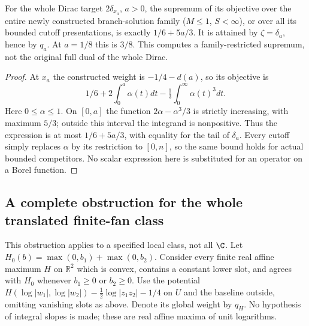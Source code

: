 \begin{proposition}\label{branch:diracobjective}
For the whole Dirac target $2\delta_{x_a}$, $a>0$, the supremum of its
objective over the entire newly constructed branch-solution family
($M\le1$, $S<\infty$), or over all its bounded cutoff presentations, is
exactly $1/6+5a/3$. It is attained by $\zeta=\delta_a$, hence by $q_a$.
At $a=1/8$ this is $3/8$. This computes a family-restricted supremum,
not the original full dual of the whole Dirac.
\end{proposition}
\begin{proof}
At $x_a$ the constructed weight is $-1/4-d(a)$, so its objective is
\[
 1/6+2\int_0^a\alpha(t)dt-\tfrac13\int_0^\infty\alpha(t)^3dt.
\]
Here $0\le\alpha\le1$. On $[0,a]$ the function
$2\alpha-\alpha^3/3$ is strictly increasing, with maximum $5/3$;
outside this interval the integrand is nonpositive. Thus the expression
is at most $1/6+5a/3$, with equality for the tail of $\delta_a$.
Every cutoff simply replaces $\alpha$ by its restriction to $[0,n]$,
so the same bound holds for actual bounded competitors. No scalar
expression here is substituted for an operator on a Borel function.
\end{proof}

\subsection{A complete obstruction for the whole translated finite-fan class}
This obstruction applies to a specified local class, not all $\C$.
Let $H_0(b)=\max(0,b_1)+\max(0,b_2)$. Consider every finite real affine
maximum $H$ on $\mathbb R^2$ which is convex, contains a constant lower
slot, and agrees with $H_0$ whenever $b_1\ge0$ or $b_2\ge0$.
Use the potential $H(\log|w_1|,\log|w_2|)-\frac12\log|z_1z_2|-1/4$
on $U$ and the baseline outside, omitting vanishing slots as above.
Denote its global weight by $q_H$. No hypothesis of integral slopes is
made; these are real affine maxima of unit logarithms.

